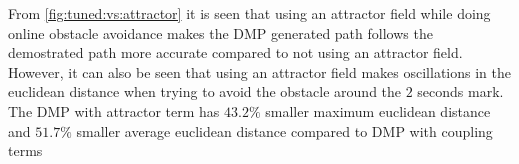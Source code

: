 \documentclass[../main.tex]{subfiles}
\begin{document}
From \autoref{fig:tuned:vs:attractor} it is seen that using an attractor field while doing online obstacle avoidance makes the DMP generated path follows the demostrated path more accurate compared to not using an attractor field. However, it can also be seen that using an attractor field makes oscillations in the euclidean distance when trying to avoid the obstacle around the $2$ seconds mark. The DMP with attractor term has $43.2 \%$ smaller maximum euclidean distance and $51.7 \%$ smaller average euclidean distance compared to DMP with coupling terms


\end{document}
